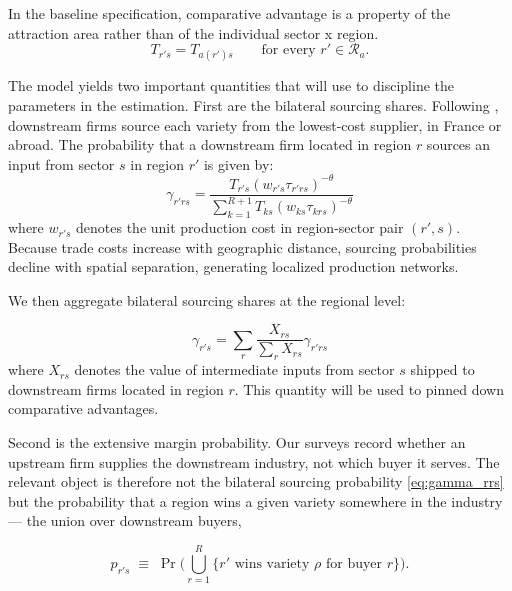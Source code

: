 In the baseline specification, comparative advantage is a property of the attraction area rather than of the individual sector x region. \begin{equation}
T_{r's}=T_{a(r')s}\qquad\text{for every }r'\in\mathcal{R}_{a}.
\label{eq:T-area}
\end{equation}

The model yields two important quantities that will use to discipline the parameters in the estimation. First are the bilateral sourcing shares. Following \cite{EatonKortum2002}, downstream firms source each variety from the lowest-cost supplier, in France or abroad. The probability that a downstream firm located in region $r$ sources an input from sector $s$ in region $r'$ is given by:
\begin{equation}
\gamma_{r'rs} = \frac{T_{r's}(w_{r's}\tau_{r'rs})^{-\theta}}
                     {\sum_{k=1}^{R+1} T_{ks}(w_{ks}\tau_{krs})^{-\theta}}
\label{eq:gamma_rrs}
\end{equation}
where $w_{r's}$ denotes the unit production cost in region-sector pair $(r',s)$. Because trade costs increase with geographic distance, sourcing probabilities decline with spatial separation, generating localized production networks. 

We then aggregate bilateral sourcing shares at the regional level:

\begin{equation}\label{eq:gamma_rs}
    \gamma_{r's}=\sum_r \frac{X_{rs}}{ \sum_r X_{rs}} \gamma_{r'rs}
\end{equation}
where $X_{rs}$ denotes the value of intermediate inputs from sector $s$ shipped to downstream firms located in region $r$. This quantity will be used to pinned down comparative advantages. 


Second is the extensive margin probability. Our surveys record whether an upstream firm supplies the downstream industry, not which buyer it serves. The relevant object is therefore not the bilateral sourcing probability \eqref{eq:gamma_rrs} but the probability that a region wins a given variety somewhere in the industry --- the union over downstream buyers,

\begin{equation}
p_{r's}\;\equiv\;\Pr\Big(\bigcup_{r=1}^{R}\big\{\text{$r'$ wins variety $\rho$ for buyer $r$}\big\}\Big).
\label{eq:p}
\end{equation}





